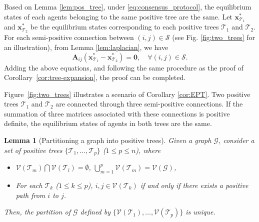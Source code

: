 \documentclass[draftclsnofoot,11pt,onecolumn]{IEEEtran}
\newtheorem{Lemma}{Lemma}
\newcommand{\m}[1]{\mathbf{#1}}
\newcommand{\mc}[1]{\mathcal{#1}}
\begin{document}
\begin{IEEEproof} Based on Lemma \ref{lem:pos_tree}, under \eqref{eq:consensus_protocol}, the equilibrium states of each agents belonging to the same positive tree are the same. Let $\m{x}_{\mc{T}_1}^*$ and $\m{x}_{\mc{T}_2}^*$ be the equilibrium states corresponding to each positive trees $\mc{T}_1$ and $\mc{T}_2$. For each semi-positive connection between $(i,j) \in \mc{S}$ (see Fig. \ref{fig:two_trees} for an illustration), from Lemma \ref{lem:laplacian}, we have
\begin{equation*}
\m{A}_{ij} (\m{x}_{\mc{T}_1}^* - \m{x}_{\mc{T}_2}^*) = \m{0}, \quad \forall (i,j) \in \mc{S}.
\end{equation*}
Adding the above equations, and following the same procedure as the proof of 
Corollary~\ref{cor:tree-expansion}, the proof can be completed.
\end{IEEEproof}

Figure~\ref{fig:two_trees} illustrates a scenario of Corollary \ref{cor:EPT}. Two positive trees $\mc{T}_1$ and $\mc{T}_2$ are connected through three semi-positive connections. If the summation of three matrices associated with these connections is positive definite, the equilibrium states of agents in both trees are the same.

\begin{Lemma}[Partitioning a graph into positive trees]\label{lem:partition}
Given a graph $\mc{G}$, consider a set of positive trees $\{\mc{T}_1, \ldots, \mc{T}_p \}$ ($1 \leq p \leq n$), where
\begin{itemize}
\item[(i)] $\mc{V}(\mc{T}_m) \bigcap \mc{V}(\mc{T}_l) = \emptyset$, $\bigcup_{m=1}^p \mc{V}(\mc{T}_m) = \mc{V}(\mc{G})$,
\item[(ii)] For each $\mc{T}_k$ ($1 \leq k \leq p$), $i, j \in \mc{V}(\mc{T}_k)$ if and only if there exists a positive path from $i$ to $j$.
\end{itemize}
Then, the partition of $\mc{G}$ defined by $\{\mc{V}(\mc{T}_1), \ldots, \mc{V}(\mc{T}_p)\}$ is unique.
\end{Lemma}
\end{document}
